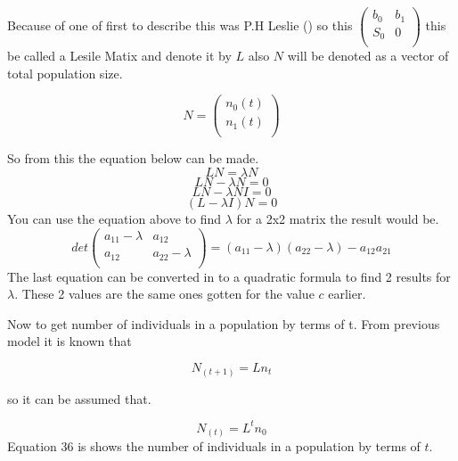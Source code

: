\documentclass[final]{cmpreport}
\begin{document}
	 Because of one of first to describe this was P.H Leslie (\cite{leslie})  so this	
	 $\begin{pmatrix} 
	 b_0 & b_1 \\ 
	 S_0 & 0  \\ 
	 \end{pmatrix}$  this be called a Lesile Matix and denote it by $L$ also $N$ will be denoted as a vector of total population size.
	 
	 \begin{equation}
	N = \begin{pmatrix} 
	 n_0(t) \\ 
	 n_1(t) \\ 
	 \end{pmatrix}
	\end{equation}
	
	So from this the equation below can be made.
	\begin{equation}
	LN= \lambda N 
	\end{equation}
	\begin{equation}
	LN - \lambda N = 0
	\end{equation}
	\begin{equation}
	 LN - \lambda N I = 0
	\end{equation}
	\begin{equation}
	 (L - \lambda  I) N = 0
	\end{equation}
	You can use the equation above to find $\lambda$ for a 2x2 matrix the result would be.
	\begin{equation}
		det \begin{pmatrix} 
		a_{11}-\lambda & a_{12} \\ 
		a_{12} & a_{22}-\lambda  \\ 
		\end{pmatrix} = (a_{11}-\lambda)(a_{22}-\lambda)-a_{12}a_{21}	
	\end{equation}
	The last equation can be converted in to a quadratic formula to find 2 results for $\lambda$. These 2 values are the same ones gotten for the value $c$ earlier. 
	
	Now to get number of individuals in a population by terms of t. From previous model it is known that
	
	\begin{equation}
	 N_(t+1) = Ln_t 
	\end{equation}
	
	so it can be assumed that.
	
	\begin{equation}
	 N_(t) = L^tn_0 
	\end{equation}
	Equation 36 is shows the number of individuals in a population by terms of $t$.
	
\end{document}
